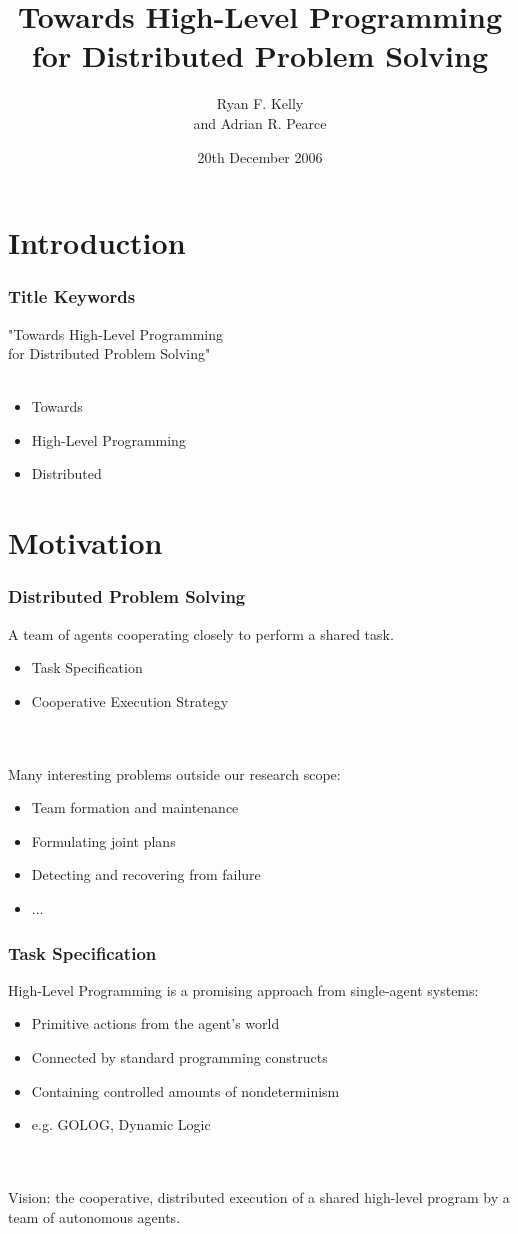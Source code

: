 \documentclass[compress]{beamer}
\title
{Towards High-Level Programming\\ for Distributed Problem Solving}
\author
{Ryan F. Kelly\\
and Adrian R. Pearce}
\institute[The University of Melbourne]
{
  Department of Computer Science and Software Engineering\\
  The University of Melbourne
}
\date[The University of Melbourne]
{20th December 2006}
\begin{document}
\begin{frame}
  \titlepage
\end{frame}

\section{Introduction}

\begin{frame}
\frametitle{Title Keywords}
\centering "Towards High-Level Programming\\
 for Distributed Problem Solving"
\ \\
\ \\
\begin{itemize}
\pause
\item Towards
\pause
\item High-Level Programming
\pause
\item Distributed
\end{itemize}
\end{frame}

\section{Motivation}

\begin{frame}
\frametitle{Distributed Problem Solving}
A team of agents cooperating closely to perform a shared task.
\begin{itemize}
\item Task Specification
\item Cooperative Execution Strategy
\end{itemize}
\ \\
\ \\
\pause
Many interesting problems outside our research scope:
\begin{itemize}
\item Team formation and maintenance
\item Formulating joint plans
\item Detecting and recovering from failure
\item ...
\end{itemize}
\end{frame}

\begin{frame}
\frametitle{Task Specification}
High-Level Programming is a promising approach from single-agent systems:
\begin{itemize}
\item Primitive actions from the agent's world
\item Connected by standard programming constructs
\item Containing controlled amounts of nondeterminism
\item e.g. GOLOG, Dynamic Logic
\end{itemize}
\ \\
\ \\
Vision: the cooperative, distributed execution of a shared high-level program by a team of autonomous agents.
\end{frame}
\end{document}
